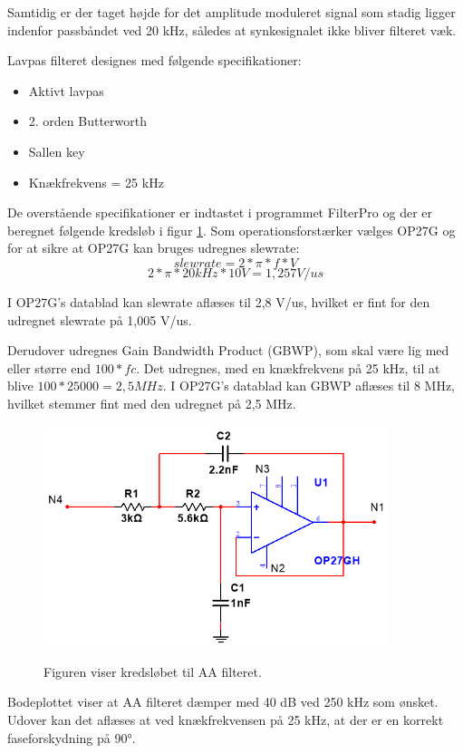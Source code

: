 Samtidig er der taget højde for det amplitude moduleret signal som stadig ligger indenfor passbåndet ved 20 kHz, således at synkesignalet ikke bliver filteret væk.

Lavpas filteret designes med følgende specifikationer:
\begin{itemize}
\item Aktivt lavpas
\item 2. orden Butterworth 
\item Sallen key
\item Knækfrekvens = 25 kHz
\end{itemize}

De overstående specifikationer er indtastet i programmet FilterPro og der er beregnet følgende kredsløb i figur \ref{Fig:aafilterdiagram}. Som operationsforstærker vælges OP27G og for at sikre at OP27G kan bruges udregnes slewrate:
$$slewrate=2*\pi*f*V$$
$$2*\pi*20kHz*10V=1,257V/us$$

I OP27G's datablad kan slewrate aflæses til 2,8 V/us, hvilket er fint for den udregnet slewrate på 1,005 V/us. 

Derudover udregnes Gain Bandwidth Product (GBWP)\cite{Baker2003}, som skal være lig med eller større end $100*fc$. Det udregnes, med en knækfrekvens på 25 kHz, til at blive $100*25000=2,5MHz$. I OP27G's datablad kan GBWP aflæses til 8 MHz, hvilket stemmer fint med den udregnet på 2,5 MHz.



\begin{figure}[H]
\centering
{\includegraphics[width=10cm]
{Figure/aafilterdiagram}}
\caption{Figuren viser kredsløbet til AA filteret.}
\label{Fig:aafilterdiagram}
\end{figure} 

Bodeplottet viser at AA filteret dæmper med 40 dB ved 250 kHz som ønsket. Udover kan det aflæses at ved knækfrekvensen på 25 kHz, at der er en korrekt faseforskydning på \ang{90}.

